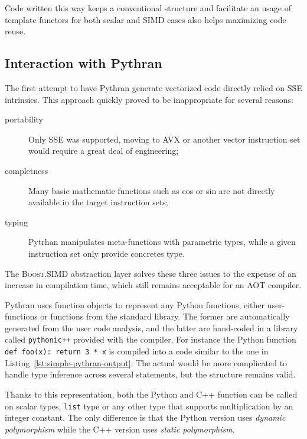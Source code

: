 \documentclass[preprint]{sigplanconf}
\providecommand{\boostsimd}{\textsc{Boost.SIMD}}
\begin{document}
Code written this way keeps a conventional structure and facilitate an usage of template
functors for both scalar and SIMD cases also helps maximizing code reuse.

\subsection{Interaction with Pythran}

The first attempt to have Pythran generate vectorized code directly relied on
SSE intrinsics. This approach quickly proved to be inappropriate for several
reasons:

\begin{description}

    \item[portability] Only SSE was supported, moving to AVX or another vector
        instruction set would require a great deal of engineering;

    \item[completness] Many basic mathematic functions such as cos or sin
        are not directly available in the target instruction sets;

    \item[typing] Pytrhan manipulates meta-functions with parametric types,
        while a given instruction set only provide concretes type.

\end{description}

The \boostsimd{} abstraction layer solves these three issues to the expense of
an increase in compilation time, which still remains acceptable for an AOT
compiler.


Pythran uses function objects to represent any Python functions, either
user-functions or functions from the standard library. The former are
automatically generated from the user code analysis, and the latter are
hand-coded in a library called \texttt{pythonic++} provided with the compiler.
For instance the Python function \texttt{def foo(x): return 3 * x} is compiled
into a code similar to the one in Listing~\ref{lst:simple-pythran-output}. The
actual would be more complicated to handle type inference across several
statements, but the structure remains valid.

Thanks to this representation, both the Python and C++ function can be called
on scalar types, \texttt{list} type or any other type that supports
multiplication by an integer constant. The only difference is that the Python
version uses \emph{dynamic polymorphism} while the C++ version uses
\emph{static polymorphism}.
\end{document}
